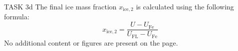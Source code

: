 TASK 3d  
The final ice mass fraction \( x_{\text{ice},2} \) is calculated using the following formula:  
\[
x_{\text{ice},2} = \frac{U - U_{\text{Fe}}}{U_{\text{FL}} - U_{\text{Fe}}}
\]  
No additional content or figures are present on the page.